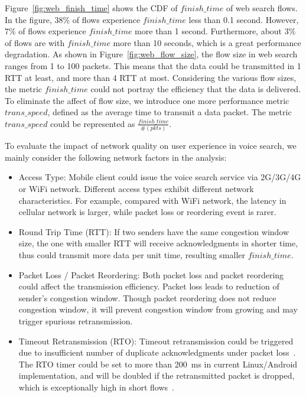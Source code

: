 Figure~\ref{fig:web_finish_time} shows the CDF of $finish\_time$ of web search flows. In the figure, 38\% of flows experience $finish\_time$ less than 0.1 second. However, 7\% of flows experience $finish\_time$ more than 1 second. Furthermore, about 3\% of flows are with $finish\_time$ more than 10 seconds, which is a great performance degradation. As shown in Figure~\ref{fig:web_flow_size}, the flow size in web search ranges from 1 to 100 packets. This means that the data could be transmitted in 1 RTT at least, and more than 4 RTT at most. Considering the various flow sizes, the metric $finish\_time$ could not portray the efficiency that the data is delivered. To eliminate the affect of flow size, we introduce one more performance metric $trans\_speed$, defined as the average time to transmit a data packet. The metric $trans\_speed$ could be represented as $\frac{finish\_time}{\#(pkts)}$.

To evaluate the impact of network quality on user experience in voice search, we mainly consider the following network factors in the analysis:

\begin{itemize}
\setlength{\itemsep}{-8pt}
\setlength{\topsep}{-8pt}
	\item {Access Type: } Mobile client could issue the voice search service via 2G/3G/4G or WiFi network. Different access types exhibit different network characteristics. For example, compared with WiFi network, the latency in cellular network is larger, while packet loss or reordering event is rarer. \\
	\item {Round Trip Time (RTT): } If two senders have the same congestion window size, the one with smaller RTT will receive acknowledgments in shorter time, thus could transmit more data per unit time, resulting smaller $finish\_time$. \\
	\item {Packet Loss / Packet Reordering: } Both packet loss and packet reordering could affect the transmission efficiency. Packet loss leads to reduction of sender's congestion window. Though packet reordering does not reduce congestion window, it will prevent congestion window from growing and may trigger spurious retransmission. \\
	\item {Timeout Retransmission (RTO): } Timeout retransmission could be triggered due to insufficient number of duplicate acknowledgments under packet loss~\cite{rfc6675}. The RTO timer could be set to more than 200~ms in current Linux/Android implementation, and will be doubled if the retransmitted packet is dropped, which is exceptionally high in short flows~\cite{flach2013reducing}.\\
\end{itemize}


